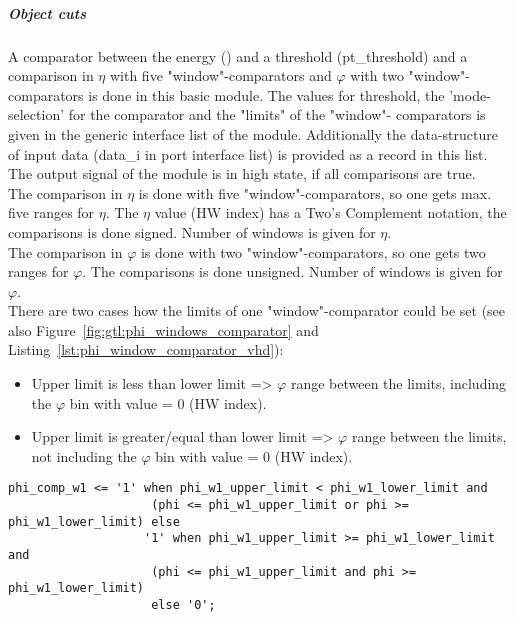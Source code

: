 %
%
\subparagraph{Object cuts}\label{sec:gtl:object_cuts}
A comparator between the energy (\pt) and a threshold (pt\_threshold) and a comparison in $\eta$ with five "window"-comparators and $\varphi$ with two "window"-comparators is done in this basic module.
The values for \pt threshold, the 'mode-selection' for the \pt comparator and the "limits" of the "window"- comparators is given in the generic interface list of the module. Additionally the data-structure of input data (data\_i in port interface list) is provided as a record in this list. The output signal of the module is in high state, if all comparisons are true.\\
The comparison in $\eta$ is done with five "window"-comparators, so one gets max. five ranges for $\eta$. The $\eta$ value (HW index) has a Two's Complement notation, the comparisons is done signed. Number of windows is given for $\eta$.\\
The comparison in $\varphi$ is done with two "window"-comparators, so one gets two ranges for $\varphi$. The comparisons is done unsigned. Number of windows is given for $\varphi$.\\
There are two cases how the limits of one "window"-comparator could be set (see also Figure~\ref{fig:gtl:phi_windows_comparator} and Listing~\ref{lst:phi_window_comparator_vhd}):
\begin{itemize}
\item Upper limit is less than lower limit => $\varphi$ range between the limits, including the $\varphi$ bin with value = 0 (HW index).
\item Upper limit is greater/equal than lower limit => $\varphi$ range between the limits, not including the $\varphi$ bin with value = 0 (HW index).
\end{itemize}
\begin{lstlisting}[label=lst:phi_window_comparator_vhd,float=here,caption=VHDL code of "window"-comparator in $\varphi$,captionpos=t]
    phi_comp_w1 <= '1' when phi_w1_upper_limit < phi_w1_lower_limit and
                    (phi <= phi_w1_upper_limit or phi >= phi_w1_lower_limit) else
                   '1' when phi_w1_upper_limit >= phi_w1_lower_limit and
                    (phi <= phi_w1_upper_limit and phi >= phi_w1_lower_limit)
                    else '0';
\end{lstlisting}

